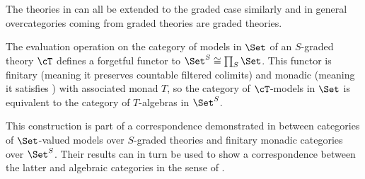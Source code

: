 \documentclass[leqno,oneside,english]{elsarticle}
\begin{document}
The theories in  can all be extended to the graded
case similarly and in general overcategories coming from graded theories
are graded theories. 
 
{{\ifshowsaveblocks
{}
\fi}}

\begin{remark}\label{rem:three-way-correspondence}
  The evaluation operation on the category of models in $\Set$ of an $S$-graded theory $\cT$ defines
  a forgetful functor to $\Set^{S}\cong \prod_{S}\Set$.
  This functor is finitary (meaning it preserves countable filtered colimits)
  and monadic (meaning it satisfies
  ) with associated monad $T$,
  so the category of $\cT$-models in $\Set$ is equivalent to the category of
  $T$-algebras in $\Set^{S}$.

  This construction is part of a correspondence demonstrated in
  \cite[App.~A]{ARV11} between categories of $\Set$-valued models over
  $S$-graded theories and finitary monadic categories over $\Set^S$.  
  Their results can in turn be used to show a correspondence between the
  latter and algebraic categories in the sense of
  \cite{Qui67,Qui70}.
\end{remark}
\end{document}
